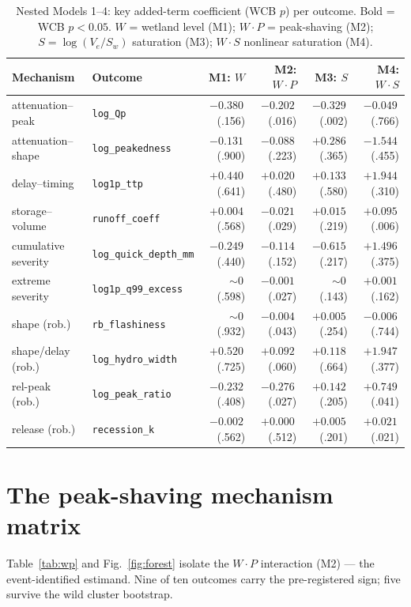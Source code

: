 \documentclass[11pt]{article}
\begin{document}
\begin{table}[htbp]\centering
\caption{Nested Models 1--4: key added-term coefficient (WCB $p$) per outcome. Bold = WCB $p<0.05$.
$W$ = wetland level (M1); $W\!\cdot\!P$ = peak-shaving (M2); $S=\log(V_e/S_w)$ saturation (M3);
$W\!\cdot\!S$ nonlinear saturation (M4).}
\label{tab:m14}
\scriptsize
\begin{tabular}{llrrrr}
\toprule
Mechanism & Outcome & M1: $W$ & M2: $W\!\cdot\!P$ & M3: $S$ & M4: $W\!\cdot\!S$ \\
\midrule
attenuation--peak    & \texttt{log\_Qp}                 & $-0.380$\,(.156) & $\mathbf{-0.202}$\,(.016) & $\mathbf{-0.329}$\,(.002) & $-0.049$\,(.766) \\
attenuation--shape   & \texttt{log\_peakedness}         & $-0.131$\,(.900) & $-0.088$\,(.223) & $+0.286$\,(.365) & $-1.544$\,(.455) \\
delay--timing        & \texttt{log1p\_ttp}              & $+0.440$\,(.641) & $+0.020$\,(.480) & $+0.133$\,(.580) & $+1.944$\,(.310) \\
storage--volume      & \texttt{runoff\_coeff}           & $+0.004$\,(.568) & $\mathbf{-0.021}$\,(.029) & $+0.015$\,(.219) & $\mathbf{+0.095}$\,(.006) \\
cumulative severity  & \texttt{log\_quick\_depth\_mm}   & $-0.249$\,(.440) & $-0.114$\,(.152) & $-0.615$\,(.217) & $+1.496$\,(.375) \\
extreme severity     & \texttt{log1p\_q99\_excess}      & $\sim0$\,(.598)  & $\mathbf{-0.001}$\,(.027) & $\sim0$\,(.143) & $+0.001$\,(.162) \\
\midrule
shape (rob.)         & \texttt{rb\_flashiness}          & $\sim0$\,(.932)  & $\mathbf{-0.004}$\,(.043) & $+0.005$\,(.254) & $-0.006$\,(.744) \\
shape/delay (rob.)   & \texttt{log\_hydro\_width}       & $+0.520$\,(.725) & $+0.092$\,(.060) & $+0.118$\,(.664) & $+1.947$\,(.377) \\
rel-peak (rob.)      & \texttt{log\_peak\_ratio}        & $-0.232$\,(.408) & $\mathbf{-0.276}$\,(.027) & $+0.142$\,(.205) & $\mathbf{+0.749}$\,(.041) \\
release (rob.)       & \texttt{recession\_k}            & $-0.002$\,(.562) & $+0.000$\,(.512) & $+0.005$\,(.201) & $\mathbf{+0.021}$\,(.021) \\
\bottomrule
\end{tabular}
\end{table}

\section{The peak-shaving mechanism matrix}
Table~\ref{tab:wp} and Fig.~\ref{fig:forest} isolate the $W\!\cdot\!P$ interaction (M2) --- the
event-identified estimand. Nine of ten outcomes carry the pre-registered sign; five survive the
wild cluster bootstrap.
\end{document}
